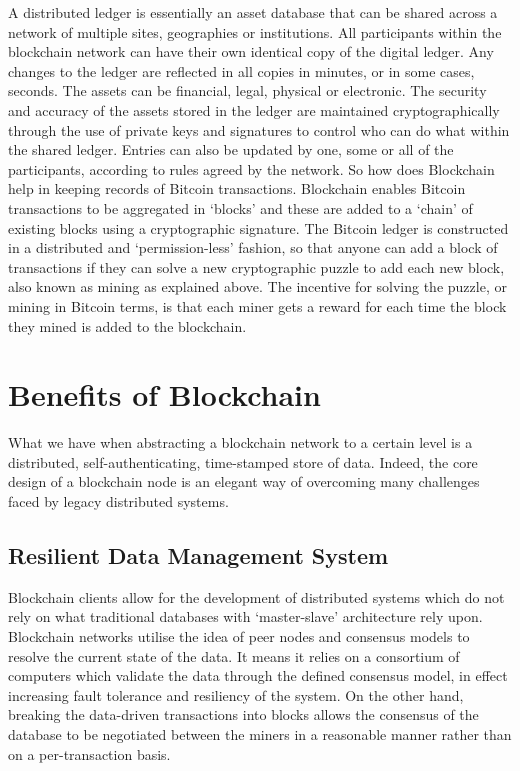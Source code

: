 A distributed ledger is essentially an asset database that can be shared across a network of multiple sites, geographies or institutions. All participants within the blockchain network can have their own identical copy of the digital ledger. Any changes to the ledger are reflected in all copies in minutes, or in some cases, seconds. The assets can be financial, legal, physical or electronic. The security and accuracy of the assets stored in the ledger are maintained cryptographically through the use of private keys and signatures to control who can do what within the shared ledger. Entries can also be updated by one, some or all of the participants, according to rules agreed by the network.\cite{Walport2015DistributedChain}
So how does Blockchain help in keeping records of Bitcoin transactions. Blockchain enables Bitcoin transactions to be aggregated in ‘blocks’ and these are added to a ‘chain’ of existing blocks using a cryptographic signature. The Bitcoin ledger is constructed in a distributed and ‘permission-less’ fashion, so that anyone can add a block of transactions if they can solve a new cryptographic puzzle to add each new block, also known as mining as explained above. The incentive for solving the puzzle, or mining in Bitcoin terms, is that each miner gets a reward for each time the block they mined is added to the blockchain.\cite{Nakamoto2008Bitcoin:System}

\section{Benefits of Blockchain}
What we have when abstracting a blockchain network to a certain level is a distributed, self-authenticating, time-stamped store of data\cite{MonaxBlockchains}. Indeed, the core design of a blockchain node is an elegant way of overcoming many challenges faced by legacy distributed systems.

\subsection{Resilient Data Management System}
Blockchain clients allow for the development of distributed systems which do not rely on what traditional databases with ‘master-slave’ architecture rely upon. Blockchain networks utilise the idea of peer nodes and consensus models to resolve the current state of the data. It means it relies on a consortium of computers which validate the data through the defined consensus model, in effect increasing fault tolerance and resiliency of the system. On the other hand, breaking the data-driven transactions into blocks allows the consensus of the database to be negotiated between the miners in a reasonable manner rather than on a per-transaction basis.

